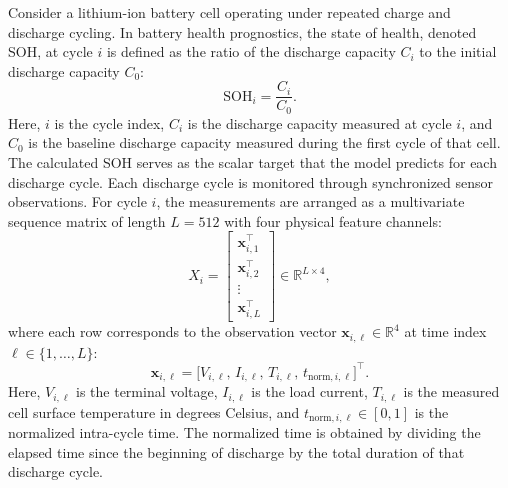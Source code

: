 \documentclass[a4paper,fleqn]{cas-sc}
\begin{document}
Consider a lithium-ion battery cell operating under repeated charge and discharge cycling. In battery health prognostics, the state of health, denoted SOH, at cycle $i$ is defined as the ratio of the discharge capacity $C_i$ to the initial discharge capacity $C_0$:
\begin{equation}
\mathrm{SOH}_i = \frac{C_i}{C_0}.
\label{eq:soh_def}
\end{equation}
Here, $i$ is the cycle index, $C_i$ is the discharge capacity measured at cycle $i$, and $C_0$ is the baseline discharge capacity measured during the first cycle of that cell. The calculated SOH serves as the scalar target that the model predicts for each discharge cycle.
Each discharge cycle is monitored through synchronized sensor observations. For cycle $i$, the measurements are arranged as a multivariate sequence matrix of length $L = 512$ with four physical feature channels:
\begin{equation}
X_i =
\begin{bmatrix}
\mathbf{x}_{i,1}^{\top} \\
\mathbf{x}_{i,2}^{\top} \\
\vdots \\
\mathbf{x}_{i,L}^{\top}
\end{bmatrix}
\in \mathbb{R}^{L \times 4},
\label{eq:input_seq}
\end{equation}
where each row corresponds to the observation vector $\mathbf{x}_{i,\ell} \in \mathbb{R}^4$ at time index $\ell \in \{1, \dots, L\}$:
\begin{equation}
\mathbf{x}_{i,\ell} = \bigl[V_{i,\ell},\, I_{i,\ell},\, T_{i,\ell},\, t_{\mathrm{norm},i,\ell}\bigr]^{\top}.
\label{eq:input_obs}
\end{equation}
Here, $V_{i,\ell}$ is the terminal voltage, $I_{i,\ell}$ is the load current, $T_{i,\ell}$ is the measured cell surface temperature in degrees Celsius, and $t_{\mathrm{norm},i,\ell} \in [0, 1]$ is the normalized intra-cycle time. The normalized time is obtained by dividing the elapsed time since the beginning of discharge by the total duration of that discharge cycle.
\end{document}

